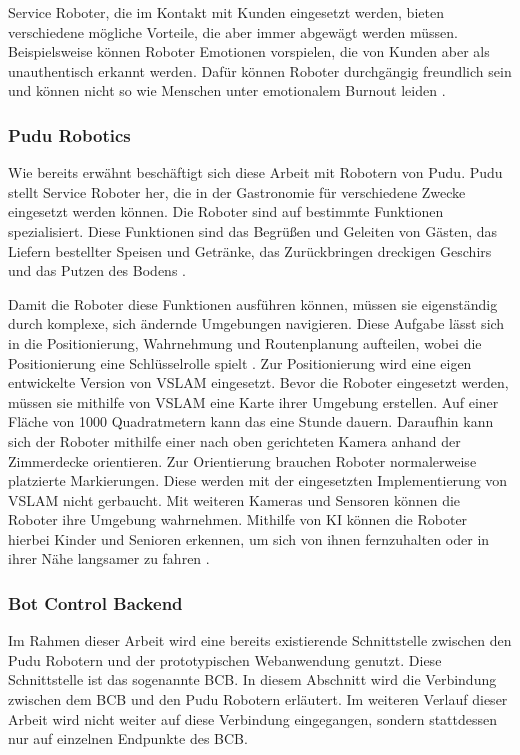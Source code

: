 Service Roboter, die im Kontakt mit Kunden eingesetzt werden, bieten verschiedene mögliche Vorteile, die aber immer abgewägt werden müssen. Beispielsweise können Roboter Emotionen vorspielen, die von Kunden aber als unauthentisch erkannt werden. Dafür können Roboter durchgängig freundlich sein und können nicht so wie Menschen unter emotionalem Burnout leiden \cite[S.~427]{Paluch2020}. 

\subsubsection{Pudu Robotics}
Wie bereits erwähnt beschäftigt sich diese Arbeit mit Robotern von Pudu. Pudu stellt Service Roboter her, die in der Gastronomie für verschiedene Zwecke eingesetzt werden können. Die Roboter sind auf bestimmte Funktionen spezialisiert. Diese Funktionen sind das Begrüßen und Geleiten von Gästen, das Liefern bestellter Speisen und Getränke, das Zurückbringen dreckigen Geschirs und das Putzen des Bodens \cite{PUDU2024}.

Damit die Roboter diese Funktionen ausführen können, müssen sie eigenständig durch komplexe, sich ändernde Umgebungen navigieren. Diese Aufgabe lässt sich in die Positionierung, Wahrnehmung und Routenplanung aufteilen, wobei die Positionierung eine Schlüsselrolle spielt \cite{Nature2022}. Zur Positionierung wird eine eigen entwickelte Version von \ac{VSLAM} eingesetzt. Bevor die Roboter eingesetzt werden, müssen sie mithilfe von \ac{VSLAM} eine Karte ihrer Umgebung erstellen. Auf einer Fläche von 1000 Quadratmetern kann das eine Stunde dauern. Daraufhin kann sich der Roboter mithilfe einer nach oben gerichteten Kamera anhand der Zimmerdecke orientieren. Zur Orientierung brauchen Roboter normalerweise platzierte Markierungen. Diese werden mit der eingesetzten Implementierung von \ac{VSLAM} nicht gerbaucht.\cite{Pudu2023} Mit weiteren Kameras und Sensoren können die Roboter ihre Umgebung wahrnehmen. Mithilfe von KI können die Roboter hierbei Kinder und Senioren erkennen, um sich von ihnen fernzuhalten oder in ihrer Nähe langsamer zu fahren \cite{Nature2022}.

\subsubsection{Bot Control Backend}\label{sec:BotControlBackend}
Im Rahmen dieser Arbeit wird eine bereits existierende Schnittstelle zwischen den Pudu Robotern und der prototypischen Webanwendung genutzt. Diese Schnittstelle ist das sogenannte \ac{BCB}. In diesem Abschnitt wird die Verbindung zwischen dem \ac{BCB} und den Pudu Robotern erläutert. Im weiteren Verlauf dieser Arbeit wird nicht weiter auf diese Verbindung eingegangen, sondern stattdessen nur auf einzelnen Endpunkte des \ac{BCB}.

